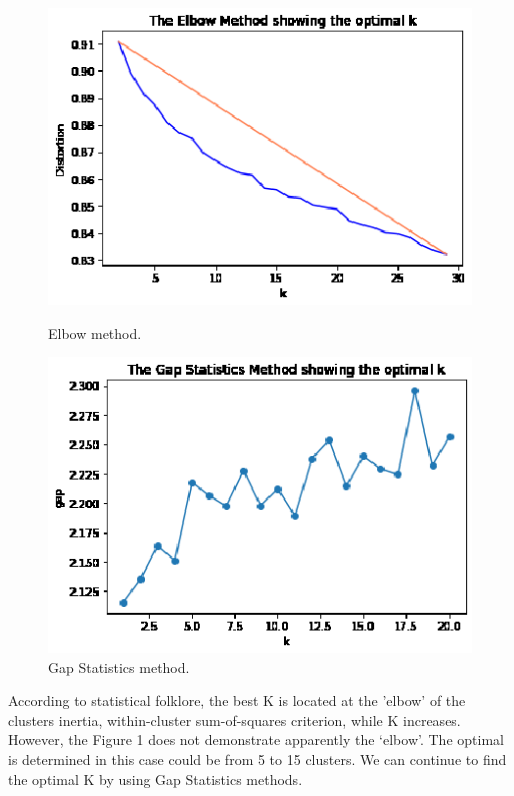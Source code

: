 \documentclass[12pt]{article}
\begin{document}
\begin{figure}[!tbp]
  \centering
  \begin{minipage}[b]{0.40\textwidth}
    \includegraphics[width=1\columnwidth]{2.eps}
    \caption{ Elbow method.}
  \end{minipage}
  \hfill
  \begin{minipage}[b]{0.40\textwidth}
    \includegraphics[width=1\columnwidth]{3gap.eps}
    \caption{ Gap Statistics method.\label{2}}
  \end{minipage}
\end{figure}

According to statistical folklore, the best K is located at the 'elbow' of the clusters inertia, within-cluster sum-of-squares criterion, while K increases. However, the Figure 1 does not demonstrate apparently the ‘elbow’. The optimal is determined in this case could be from 5 to 15 clusters. We can continue to find the optimal K by using Gap Statistics methods. 
\end{document}

